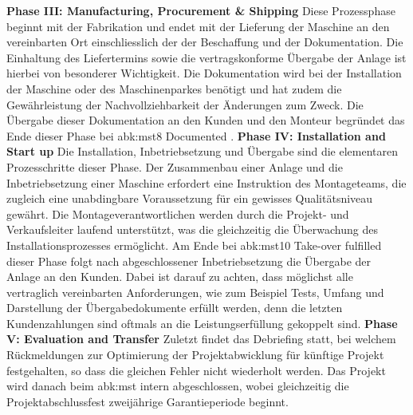 \newline\newline
\textbf{Phase III: Manufacturing, Procurement \& Shipping}
\newline
Diese Prozessphase beginnt mit der Fabrikation und endet mit der Lieferung der Maschine an den vereinbarten Ort einschliesslich der der Beschaffung und der Dokumentation. Die Einhaltung des Liefertermins sowie die vertragskonforme Übergabe der Anlage ist hierbei von besonderer Wichtigkeit. Die Dokumentation wird bei der Installation der Maschine oder des Maschinenparkes benötigt und hat zudem die Gewährleistung der Nachvollziehbarkeit der Änderungen zum Zweck. Die Übergabe dieser Dokumentation an den Kunden und den Monteur begründet das Ende dieser Phase bei \gls{abk:mst}8 \glqq Documented \grqq.
\newline\newline
\textbf{Phase IV: Installation and Start up}
\newline
Die Installation, Inbetriebsetzung und Übergabe sind die elementaren Prozesschritte dieser Phase. Der Zusammenbau einer Anlage und die Inbetriebsetzung einer Maschine erfordert eine Instruktion des Montageteams, die zugleich eine unabdingbare Voraussetzung für ein gewisses Qualitätsniveau gewährt. Die Montageverantwortlichen werden durch die Projekt- und Verkaufsleiter laufend unterstützt, was die gleichzeitig die Überwachung des Installationsprozesses ermöglicht. Am Ende bei \gls{abk:mst}10 \glqq Take-over fulfilled\grqq{ } dieser Phase folgt nach abgeschlossener Inbetriebsetzung die Übergabe der Anlage an den Kunden. Dabei ist darauf zu achten, dass möglichst alle vertraglich vereinbarten Anforderungen, wie zum Beispiel Tests, Umfang und Darstellung der Übergabedokumente erfüllt werden, denn die letzten Kundenzahlungen sind oftmals an die Leistungserfüllung gekoppelt sind. 
\newline
\textbf{Phase V: Evaluation and Transfer}
\newline
Zuletzt findet das Debriefing statt, bei welchem Rückmeldungen zur Optimierung der Projektabwicklung für künftige Projekt festgehalten, so dass die gleichen Fehler nicht wiederholt werden. Das Projekt wird danach beim \gls{abk:mst} intern abgeschlossen, wobei gleichzeitig die Projektabschlussfest zweijährige Garantieperiode beginnt.
%
